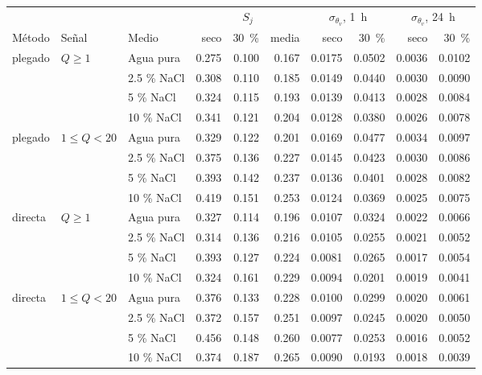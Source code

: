 \begin{tabular}{lll rrr rr rr}
\toprule
 & & & \multicolumn{3}{c}{$S_j$} & \multicolumn{2}{c}{$\sigma_{\theta_v}$, 1~h} & \multicolumn{2}{c}{$\sigma_{\theta_v}$, 24~h} \\
\cmidrule(lr){4-6}\cmidrule(lr){7-8}\cmidrule(lr){9-10}
Método & Señal & Medio & seco & 30~\% & media & seco & 30~\% & seco & 30~\% \\
\midrule
plegado & $Q\geq1$ & Agua pura & 0.275 & 0.100 & 0.167 & 0.0175 & 0.0502 & 0.0036 & 0.0102 \\
 &  & 2.5 \% NaCl & 0.308 & 0.110 & 0.185 & 0.0149 & 0.0440 & 0.0030 & 0.0090 \\
 &  & 5 \% NaCl & 0.324 & 0.115 & 0.193 & 0.0139 & 0.0413 & 0.0028 & 0.0084 \\
 &  & 10 \% NaCl & 0.341 & 0.121 & 0.204 & 0.0128 & 0.0380 & 0.0026 & 0.0078 \\
\midrule
plegado & $1\leq Q<20$ & Agua pura & 0.329 & 0.122 & 0.201 & 0.0169 & 0.0477 & 0.0034 & 0.0097 \\
 &  & 2.5 \% NaCl & 0.375 & 0.136 & 0.227 & 0.0145 & 0.0423 & 0.0030 & 0.0086 \\
 &  & 5 \% NaCl & 0.393 & 0.142 & 0.237 & 0.0136 & 0.0401 & 0.0028 & 0.0082 \\
 &  & 10 \% NaCl & 0.419 & 0.151 & 0.253 & 0.0124 & 0.0369 & 0.0025 & 0.0075 \\
\midrule
directa & $Q\geq1$ & Agua pura & 0.327 & 0.114 & 0.196 & 0.0107 & 0.0324 & 0.0022 & 0.0066 \\
 &  & 2.5 \% NaCl & 0.314 & 0.136 & 0.216 & 0.0105 & 0.0255 & 0.0021 & 0.0052 \\
 &  & 5 \% NaCl & 0.393 & 0.127 & 0.224 & 0.0081 & 0.0265 & 0.0017 & 0.0054 \\
 &  & 10 \% NaCl & 0.324 & 0.161 & 0.229 & 0.0094 & 0.0201 & 0.0019 & 0.0041 \\
\midrule
directa & $1\leq Q<20$ & Agua pura & 0.376 & 0.133 & 0.228 & 0.0100 & 0.0299 & 0.0020 & 0.0061 \\
 &  & 2.5 \% NaCl & 0.372 & 0.157 & 0.251 & 0.0097 & 0.0245 & 0.0020 & 0.0050 \\
 &  & 5 \% NaCl & 0.456 & 0.148 & 0.260 & 0.0077 & 0.0253 & 0.0016 & 0.0052 \\
 &  & 10 \% NaCl & 0.374 & 0.187 & 0.265 & 0.0090 & 0.0193 & 0.0018 & 0.0039 \\
\bottomrule
\end{tabular}
